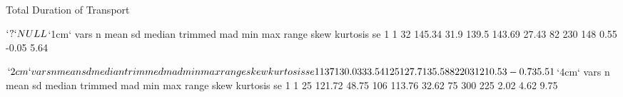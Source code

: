 \documentclass{article}
\begin{document}
Total Duration of Transport
\begin{Schunk}
\begin{Soutput}
$`?`
NULL

$`1cm`
  vars  n   mean   sd median trimmed   mad min max range skew kurtosis   se
1    1 32 145.34 31.9  139.5  143.69 27.43  82 230   148 0.55    -0.05 5.64

$`2cm`
  vars  n   mean    sd median trimmed   mad min max range skew kurtosis   se
1    1 37 130.03 33.54    125  127.71 35.58  82 203   121 0.53    -0.73 5.51

$`4cm`
  vars  n   mean    sd median trimmed   mad min max range skew kurtosis   se
1    1 25 121.72 48.75    106  113.76 32.62  75 300   225 2.02     4.62 9.75
\end{Soutput}
\end{Schunk}
\end{document}
